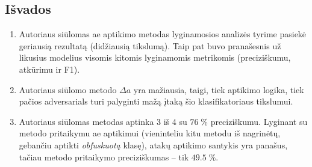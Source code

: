 \subsection*{Išvados}

\begin{enumerate}
    \item Autoriaus siūlomas \gls{ae} aptikimo metodas lyginamosios analizės tyrime pasiekė geriausią rezultatą (didžiausią tikslumą). Taip pat buvo pranašesnis už likusius modelius visomis kitomis lyginamomis metrikomis (preciziškumu, atkūrimu ir F1).
    \item Autoriaus siūlomo metodo $\Delta a$ yra mažiausia, taigi, tiek  aptikimo logika, tiek pačios \glspl{adversarial} turi palyginti mažą įtaką šio klasifikatoriaus tikslumui.
    \item Autoriaus siūlomas metodas aptinka 3 iš 4  su $\num{76}\;\%$ preciziškumu. Lyginant su \LIME metodo pritaikymu \gls{ae} aptikimui (vieninteliu kitu metodu iš nagrinėtų, gebančiu aptikti \textit{obfuskuotą} klasę), atakų aptikimo santykis yra panašus, tačiau \LIME metodo pritaikymo preciziškumas -- tik $\num{49,5}\;\%$.
\end{enumerate}
